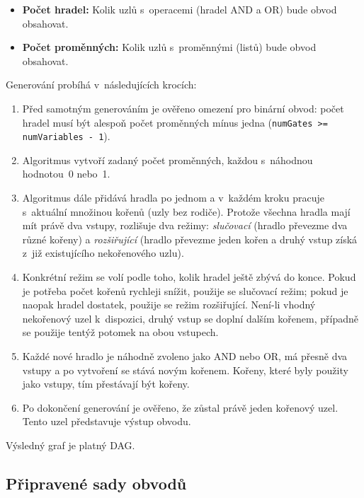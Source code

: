 \begin{itemize}
    \item \textbf{Počet hradel:} Kolik uzlů s~operacemi (hradel AND a OR) bude obvod obsahovat.
    \item \textbf{Počet proměnných:} Kolik uzlů s~proměnnými (listů) bude obvod obsahovat.
\end{itemize}

Generování probíhá v~následujících krocích:

\begin{enumerate}
    \item Před samotným generováním je ověřeno omezení pro binární obvod: počet hradel musí být alespoň počet proměnných mínus jedna (\texttt{numGates >= numVariables - 1}).

    \item Algoritmus vytvoří zadaný počet proměnných, každou s~náhodnou hodnotou~0 nebo~1.

    \item Algoritmus dále přidává hradla po jednom a v~každém kroku pracuje s~aktuální množinou kořenů (uzly bez rodiče). Protože všechna hradla mají mít právě dva vstupy, rozlišuje dva režimy: \emph{slučovací} (hradlo převezme dva různé kořeny) a \emph{rozšiřující} (hradlo převezme jeden kořen a druhý vstup získá z~již existujícího nekořenového uzlu).

    \item Konkrétní režim se volí podle toho, kolik hradel ještě zbývá do konce. Pokud je potřeba počet kořenů rychleji snížit, použije se slučovací režim; pokud je naopak hradel dostatek, použije se režim rozšiřující. Není-li vhodný nekořenový uzel k~dispozici, druhý vstup se doplní dalším kořenem, případně se použije tentýž potomek na obou vstupech.

    \item Každé nové hradlo je náhodně zvoleno jako AND nebo OR, má přesně dva vstupy a po vytvoření se stává novým kořenem. Kořeny, které byly použity jako vstupy, tím přestávají být kořeny.

    \item Po dokončení generování je ověřeno, že zůstal právě jeden kořenový uzel. Tento uzel představuje výstup obvodu.
\end{enumerate}

Výsledný graf je platný DAG.

\subsection{Připravené sady obvodů}
\label{sec:MCVPPreparedSetsImpl}

